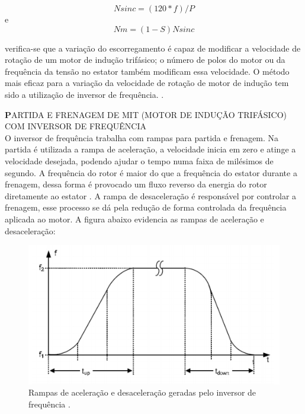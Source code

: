     \begin{equation}\label{Rotação Sinc.}
            Nsinc=(120*f)/P
    \end{equation}
    e
    \begin{equation}\label{Rotação Sinc.}
     Nm=(1-S)Nsinc
    \end{equation}

     verifica-se que a variação do escorregamento é capaz de modificar a velocidade de rotação de um motor de indução 
     trifásico; o número de polos do motor ou da frequência da tensão no estator também modificam essa velocidade. 
     O método mais eficaz para a variação da velocidade de rotação de motor de indução tem sido a utilização de inversor de 
     frequência. \cite{WEG2}.

     \textbf PARTIDA E FRENAGEM DE MIT (MOTOR DE INDUÇÃO TRIFÁSICO) COM INVERSOR DE FREQUÊNCIA\\

     O inversor de frequência trabalha com rampas para partida e frenagem. Na partida é utilizada a rampa de aceleração, a velocidade inicia em zero e atinge a velocidade desejada, podendo ajudar o tempo numa faixa de milésimos de segundo.
    A frequência do rotor é maior do que a frequência do estator durante a frenagem, dessa forma é provocado um fluxo reverso da energia do rotor diretamente ao estator \cite{covino}. A rampa de desaceleração é responsável por controlar a frenagem, esse processo se dá pela redução de forma controlada da frequência aplicada ao motor.
    A figura abaixo evidencia as rampas de aceleração e desaceleração:\\

 \begin{figure}[h]
    \centering
    \label{oldr}
    \includegraphics[keepaspectratio=true,scale=0.75]{figuras/rampa_aceleracao.png}
    \caption{Rampas de aceleração e desaceleração geradas pelo inversor de frequência \cite{siemens}.}
    \end{figure}


